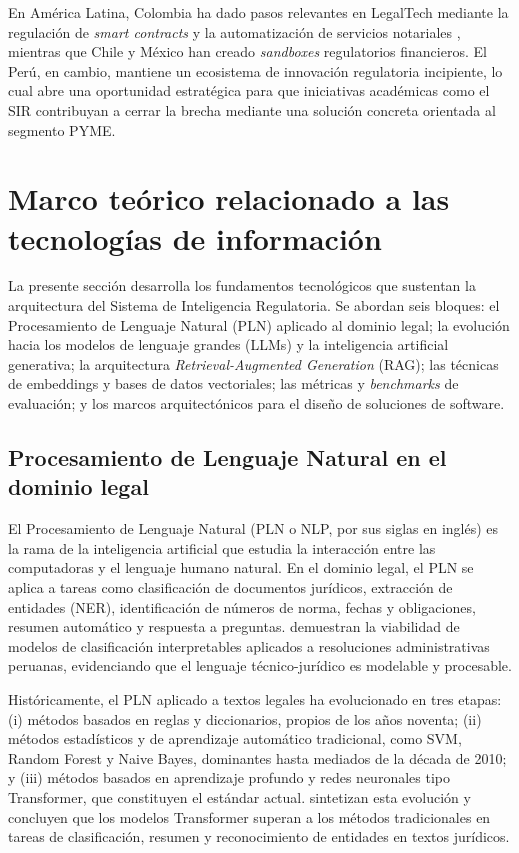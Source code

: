\documentclass[12pt,a4paper,oneside]{report}
\begin{document}
En América Latina, Colombia ha dado pasos relevantes en LegalTech mediante la regulación de \textit{smart contracts} y la automatización de servicios notariales \parencite{rinconmartinez2022}, mientras que Chile y México han creado \textit{sandboxes} regulatorios financieros. El Perú, en cambio, mantiene un ecosistema de innovación regulatoria incipiente, lo cual abre una oportunidad estratégica para que iniciativas académicas como el SIR contribuyan a cerrar la brecha mediante una solución concreta orientada al segmento PYME.

\section{Marco teórico relacionado a las tecnologías de información}\label{sec:marco-teorico-tecnologias-informacion}

La presente sección desarrolla los fundamentos tecnológicos que sustentan la arquitectura del Sistema de Inteligencia Regulatoria. Se abordan seis bloques: el Procesamiento de Lenguaje Natural (PLN) aplicado al dominio legal; la evolución hacia los modelos de lenguaje grandes (LLMs) y la inteligencia artificial generativa; la arquitectura \textit{Retrieval-Augmented Generation} (RAG); las técnicas de embeddings y bases de datos vectoriales; las métricas y \textit{benchmarks} de evaluación; y los marcos arquitectónicos para el diseño de soluciones de software.

\subsection{Procesamiento de Lenguaje Natural en el dominio legal}\label{subsec:pln-dominio-legal}

El Procesamiento de Lenguaje Natural (PLN o NLP, por sus siglas en inglés) es la rama de la inteligencia artificial que estudia la interacción entre las computadoras y el lenguaje humano natural. En el dominio legal, el PLN se aplica a tareas como clasificación de documentos jurídicos, extracción de entidades (NER), identificación de números de norma, fechas y obligaciones, resumen automático y respuesta a preguntas. \textcite{alcantarafrancia2024} demuestran la viabilidad de modelos de clasificación interpretables aplicados a resoluciones administrativas peruanas, evidenciando que el lenguaje técnico-jurídico es modelable y procesable.

Históricamente, el PLN aplicado a textos legales ha evolucionado en tres etapas: (i) métodos basados en reglas y diccionarios, propios de los años noventa; (ii) métodos estadísticos y de aprendizaje automático tradicional, como SVM, Random Forest y Naive Bayes, dominantes hasta mediados de la década de 2010; y (iii) métodos basados en aprendizaje profundo y redes neuronales tipo Transformer, que constituyen el estándar actual. \textcite{noronha2025} sintetizan esta evolución y concluyen que los modelos Transformer superan a los métodos tradicionales en tareas de clasificación, resumen y reconocimiento de entidades en textos jurídicos.
\end{document}
